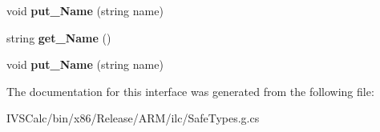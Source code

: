 \begin{DoxyCompactItemize}
void {\bfseries put\+\_\+\+Name} (string name)
\item 
\mbox{\label{interface_windows_1_1_graphics_1_1_effects_1_1_i_graphics_effect_a454ca57c1c03185d8c4900e57695a241}} 
string {\bfseries get\+\_\+\+Name} ()
\item 
\mbox{\label{interface_windows_1_1_graphics_1_1_effects_1_1_i_graphics_effect_aa7b3ef16ef19077fb68310cc85f5b04a}} 
void {\bfseries put\+\_\+\+Name} (string name)
\end{DoxyCompactItemize}


The documentation for this interface was generated from the following file\+:\begin{DoxyCompactItemize}
\item 
I\+V\+S\+Calc/bin/x86/\+Release/\+A\+R\+M/ilc/Safe\+Types.\+g.\+cs\end{DoxyCompactItemize}
